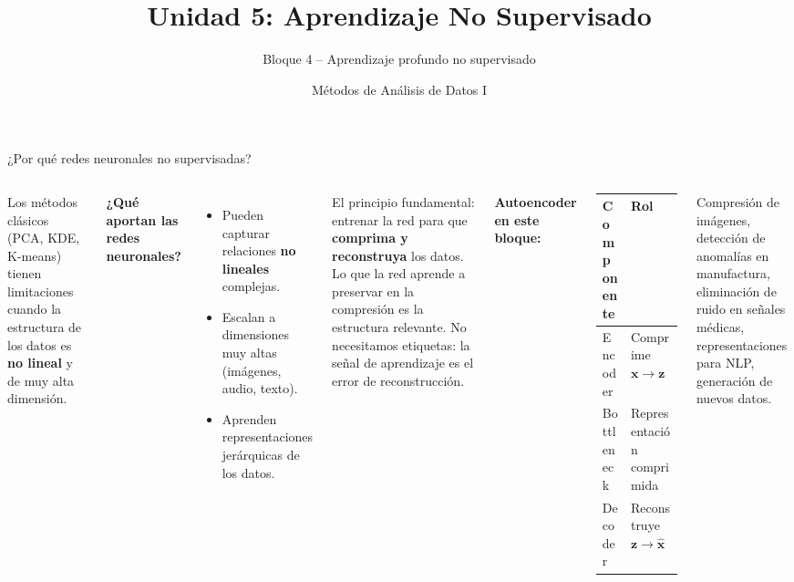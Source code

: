 \documentclass[aspectratio=169]{beamer}
\title[Unidad 5 -- Autoencoders]{Unidad 5: Aprendizaje No Supervisado}
\subtitle{Bloque 4 -- Aprendizaje profundo no supervisado}
\author[MAD1 -- UNS]{Métodos de Análisis de Datos I}
\institute{Departamento de Matemática -- Universidad Nacional del Sur}
\date{}
\begin{document}

\begin{frame}
\titlepage
\end{frame}

\begin{frame}{¿Por qué redes neuronales no supervisadas?}
\begin{columns}[T]
Los métodos clásicos (PCA, KDE, K-means) tienen limitaciones cuando la estructura de los datos es \textbf{no lineal} y de muy alta dimensión.

\medskip
\textbf{¿Qué aportan las redes neuronales?}
\begin{itemize}
  \item Pueden capturar relaciones \textbf{no lineales} complejas.
  \item Escalan a dimensiones muy altas (imágenes, audio, texto).
  \item Aprenden representaciones jerárquicas de los datos.
\end{itemize}

\medskip
\begin{concepto}
El principio fundamental: entrenar la red para que \textbf{comprima y reconstruya} los datos. Lo que la red aprende a preservar en la compresión es la estructura relevante. No necesitamos etiquetas: la señal de aprendizaje es el error de reconstrucción.
\end{concepto}

\textbf{Autoencoder en este bloque:}

\medskip
{\small
\begin{tabular}{ll}
\toprule
\textbf{Componente} & \textbf{Rol} \\
\midrule
Encoder    & Comprime $\mathbf{x} \to \mathbf{z}$ \\
Bottleneck & Representación comprimida \\
Decoder    & Reconstruye $\mathbf{z} \to \hat{\mathbf{x}}$ \\
\bottomrule
\end{tabular}
}

\medskip
\begin{aplicacion}
Compresión de imágenes, detección de anomalías en manufactura, eliminación de ruido en señales médicas, representaciones para NLP, generación de nuevos datos.
\end{aplicacion}
\end{columns}
\end{frame}
\end{document}
